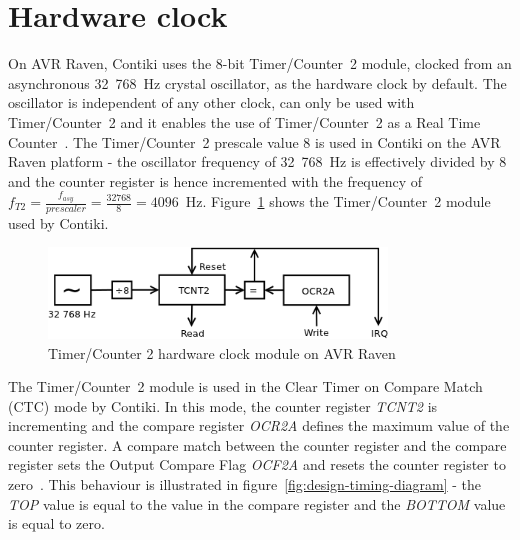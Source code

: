 
\section{Hardware clock}\label{sec:analysis-hwclock}
On AVR Raven, Contiki uses the 8-bit Timer/Counter~2 module,
clocked from an asynchronous 32~768~Hz crystal oscillator, as the hardware clock by default.
The oscillator is independent of any other clock,
can only be used with Timer/Counter~2 and it
enables the use of Timer/Counter~2 as a Real Time Counter~\cite{avr-datasheet}.
The Timer/Counter~2 prescale value 8 is used in Contiki on the AVR Raven platform -
the oscillator frequency of 32~768~Hz is effectively divided by 8 and
the counter register is hence incremented with the frequency of
$f_{T2} = {\frac{f_{asy}}{prescaler}} = {\frac{32768}{8}} = 4096$~Hz.
Figure~\ref{fig:avr-clock} shows the Timer/Counter~2 module used by Contiki.
\begin{figure}
  \centering
  \includegraphics[width=9cm,keepaspectratio]{fig/avr-clock.png}
  \caption{Timer/Counter 2 hardware clock module on AVR Raven}
  \label{fig:avr-clock}
\end{figure}


The Timer/Counter~2 module is used in the Clear Timer on Compare Match (CTC) mode by Contiki.
In this mode, the counter register {\it{TCNT2}} is incrementing
and the compare register {\it{OCR2A}} defines the maximum value of the counter register.
A compare match between the counter register and the compare register
sets the Output Compare Flag {\it{OCF2A}} and resets the counter register to zero~\cite{avr-datasheet}.
This behaviour is illustrated in figure~\ref{fig:design-timing-diagram}
- the {\it{TOP}} value is equal to the value in the compare register and the {\it{BOTTOM}} value is equal to zero.

